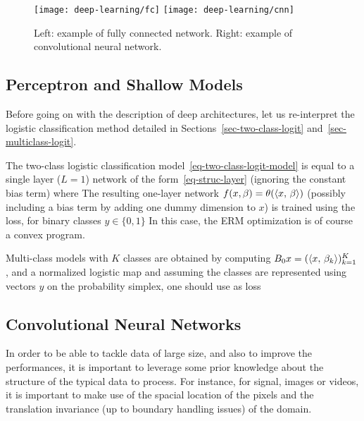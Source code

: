\begin{figure}
\texttt{[image: deep-learning/fc]} \quad
\texttt{[image: deep-learning/cnn]}
\caption{\label{fig-bgd}
Left: example of fully connected network.
Right: example of convolutional neural network.
}
\end{figure}


\subsection{Perceptron and Shallow Models}

Before going on with the description of deep architectures, let us re-interpret the logistic classification method detailed in Sections~\ref{sec-two-class-logit} and~\ref{sec-multiclass-logit}.

The two-class logistic classification model~\eqref{eq-two-class-logit-model} is equal to a single layer ($L=1$) network of the form~\eqref{eq-struc-layer} (ignoring the constant bias term) where 
The resulting one-layer network $f(x,\beta) = \theta(\langle x,\,\beta\rangle)$ (possibly including a bias term by adding one dummy dimension to $x$) is trained using the loss, for binary classes $y \in \{0,1\}$ 
In this case, the ERM optimization is of course a convex program. 

Multi-class models with $K$ classes are obtained by computing $B_0 x = (\langle x,\,\beta_k\rangle)_{k=1}^K$, and a normalized logistic map 
and assuming the classes are represented using vectors $y$ on the probability simplex, one should use as loss

\subsection{Convolutional Neural Networks}
\label{sec-cnn}

In order to be able to tackle data of large size, and also to improve the performances, it is important to leverage some prior knowledge about the structure of the typical data to process. For instance, for signal, images or videos, it is important to make use of the spacial location of the pixels and the translation invariance (up to boundary handling issues) of the domain.

